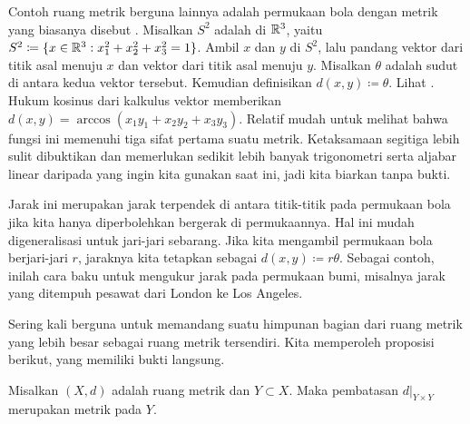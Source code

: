 \begin{example}
Contoh ruang metrik berguna lainnya adalah permukaan bola
dengan metrik yang biasanya disebut \emph{}.
Misalkan $S^2$ adalah  di ${\mathbb{R}}^3$,
yaitu $S^2 \coloneqq \{ x \in {\mathbb{R}}^3 : x_1^2+x_2^2+x_3^2 = 1 \}$.
Ambil $x$ dan $y$ di $S^2$, lalu pandang vektor dari titik asal menuju $x$
dan vektor dari titik asal menuju $y$.
Misalkan $\theta$ adalah sudut di antara kedua vektor tersebut.
Kemudian definisikan $d(x,y) \coloneqq \theta$.  Lihat .
Hukum kosinus dari kalkulus vektor memberikan
$d(x,y) = \arccos(x_1y_1+x_2y_2+x_3y_3)$.
Relatif mudah untuk melihat bahwa fungsi ini memenuhi tiga sifat pertama
suatu metrik.
Ketaksamaan segitiga lebih sulit dibuktikan dan memerlukan sedikit lebih banyak
trigonometri serta aljabar linear daripada yang ingin kita gunakan saat ini,
jadi kita biarkan tanpa bukti.

\begin{myfigureht}
\caption{Jarak lingkaran besar pada permukaan
bola satuan.\label{fig:spheremetric}}
\end{myfigureht}

Jarak ini merupakan jarak terpendek di antara titik-titik pada permukaan bola jika
kita hanya diperbolehkan bergerak di permukaannya.  Hal ini mudah
digeneralisasi untuk jari-jari sebarang.  Jika kita mengambil permukaan bola berjari-jari
$r$, jaraknya kita tetapkan sebagai $d(x,y) \coloneqq r \theta$.  Sebagai contoh, inilah
cara baku untuk mengukur jarak pada
permukaan bumi, misalnya jarak yang ditempuh pesawat dari London ke
Los Angeles.
\end{example}

Sering kali berguna untuk memandang suatu himpunan bagian dari ruang metrik yang lebih besar
sebagai ruang metrik tersendiri.  Kita memperoleh proposisi berikut, yang
memiliki bukti langsung.

\begin{prop}
Misalkan $(X,d)$ adalah ruang metrik dan $Y \subset X$.  Maka pembatasan
$d|_{Y \times Y}$ merupakan metrik pada $Y$.
\end{prop}

